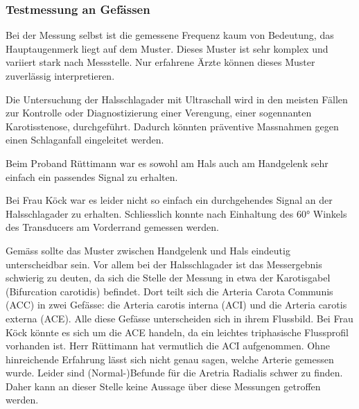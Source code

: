 \documentclass[11pt]{scrartcl}
\begin{document}
    \subsubsection{Testmessung an Gefässen}
    Bei der Messung selbst ist die gemessene Frequenz kaum von Bedeutung, das Hauptaugenmerk liegt auf dem Muster.
    Dieses Muster ist sehr komplex und variiert stark nach Messstelle.
    Nur erfahrene Ärzte können dieses Muster zuverlässig interpretieren.

    Die Untersuchung der Halsschlagader mit Ultraschall wird in den meisten Fällen zur Kontrolle oder Diagnostizierung
    einer Verengung, einer sogennanten Karotisstenose, durchgeführt.
    Dadurch könnten präventive Massnahmen gegen einen Schlaganfall eingeleitet werden.

    Beim Proband Rüttimann war es sowohl am Hals auch am Handgelenk sehr einfach ein passendes Signal zu erhalten.

    Bei Frau Köck war es leider nicht so einfach ein durchgehendes Signal an der Halsschlagader zu erhalten.
    Schliesslich konnte nach Einhaltung des 60° Winkels des Transducers am Vorderrand gemessen werden.

    Gemäss \cite{duplex} sollte das Muster zwischen Handgelenk und Hals eindeutig unterscheidbar sein.
    Vor allem bei der Halsschlagader ist das Messergebnis schwierig zu deuten, da sich die Stelle der Messung in etwa
    der Karotisgabel (Bifurcation carotidis) befindet.
    Dort teilt sich die Arteria Carota Communis (ACC) in zwei Gefässe: die Arteria carotis interna (ACI) und die
    Arteria carotis externa (ACE).
    Alle diese Gefässe unterscheiden sich in ihrem Flussbild.
    Bei Frau Köck könnte es sich um die ACE handeln, da ein leichtes triphasische Flussprofil vorhanden ist.
    Herr Rüttimann hat vermutlich die ACI aufgenommen.
    Ohne hinreichende Erfahrung lässt sich nicht genau sagen, welche Arterie gemessen wurde.
    Leider sind (Normal-)Befunde für die Aretria Radialis schwer zu finden.
    Daher kann an dieser Stelle keine Aussage über diese Messungen getroffen werden.

\end{document}
